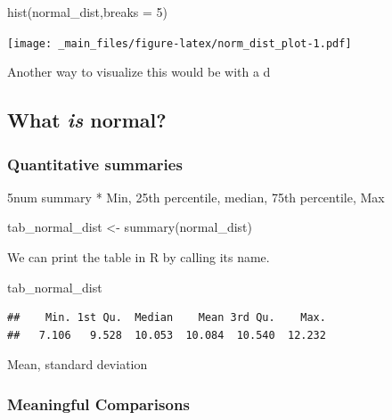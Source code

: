 \documentclass[
]{book}
\newenvironment{Shaded}{\begin{snugshade}}{\end{snugshade}}
\newcommand{\AttributeTok}[1]{\textcolor[rgb]{0.77,0.63,0.00}{#1}}
\newcommand{\DecValTok}[1]{\textcolor[rgb]{0.00,0.00,0.81}{#1}}
\newcommand{\FunctionTok}[1]{\textcolor[rgb]{0.00,0.00,0.00}{#1}}
\newcommand{\NormalTok}[1]{#1}
\newcommand{\OtherTok}[1]{\textcolor[rgb]{0.56,0.35,0.01}{#1}}
\begin{document}
\begin{Shaded}
\begin{Highlighting}[]
\FunctionTok{hist}\NormalTok{(normal\_dist,}\AttributeTok{breaks =} \DecValTok{5}\NormalTok{)}
\end{Highlighting}
\end{Shaded}

\texttt{[image: \_main\_files/figure-latex/norm\_dist\_plot-1.pdf]}

Another way to visualize this would be with a d

\hypertarget{what-is-normal}{%
\subsection{\texorpdfstring{What \emph{is} normal?}{What is normal?}}\label{what-is-normal}}

\hypertarget{quantitative-summaries}{%
\subsubsection{Quantitative summaries}\label{quantitative-summaries}}

5num summary
* Min, 25th percentile, median, 75th percentile, Max

\begin{Shaded}
\begin{Highlighting}[]
\NormalTok{tab\_normal\_dist }\OtherTok{\textless{}{-}} \FunctionTok{summary}\NormalTok{(normal\_dist)}
\end{Highlighting}
\end{Shaded}

We can print the table in R by calling its name.

\begin{Shaded}
\begin{Highlighting}[]
\NormalTok{tab\_normal\_dist}
\end{Highlighting}
\end{Shaded}

\begin{verbatim}
##    Min. 1st Qu.  Median    Mean 3rd Qu.    Max. 
##   7.106   9.528  10.053  10.084  10.540  12.232
\end{verbatim}

Mean, standard deviation

\hypertarget{meaningful-comparisons}{%
\subsubsection{Meaningful Comparisons}\label{meaningful-comparisons}}
\end{document}
